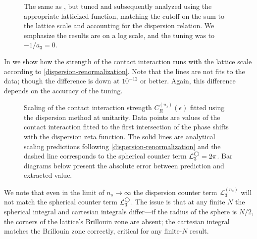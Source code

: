 \begin{figure}[htb]
    \scalebox{0.9}{}
    \caption{The same as , but tuned and subsequently analyzed using the appropriate latticized \Luscher function, matching the cutoff on the sum to the lattice scale and accounting for the dispersion relation.
    We emphasize the results are on a log scale, and the tuning was to $-1/a_3 = 0$.
    }
    \label{fig:unimproved dispersion}
\end{figure}

In  we show how the strength of the contact interaction runs with the lattice scale according to \eqref{dispersion-renormalization}.
Note that the lines are not fits to the data; though the difference is down at $10^{-12}$ or better.
Again, this difference depends on the accuracy of the tuning.

\begin{figure}
    \scalebox{0.8}{}
    \caption{
        Scaling of the contact interaction strength $C_R^{(n_s)}(\epsilon)$ fitted using the dispersion method at unitarity.
        Data points are values of the contact interaction fitted to the first intersection of the phase shifts with the dispersion zeta function.
        The solid lines are analytical scaling predictions following \eqref{dispersion-renormalization} and the dashed line corresponds to the spherical counter term $ \mathcal{L}^{\bigcirc}_3 = 2 \pi$.
        Bar diagrams below present the absolute error between prediction and extracted value.
    }
    \label{fig:dispersion running of strength}
\end{figure}

We note that even in the limit of $n_s \to \infty$ the dispersion counter term $\mathcal{L}^{(n_s)}_3$ will not match the spherical counter term $\mathcal{L}^{\bigcirc}_3$.
The issue is that at any finite $N$ the spherical integral and cartesian integrals differ---if the radius of the sphere is $N/2$, the corners of the lattice's Brillouin zone are absent; the cartesian integral matches the Brillouin zone correctly, critical for any finite-$N$ result.

